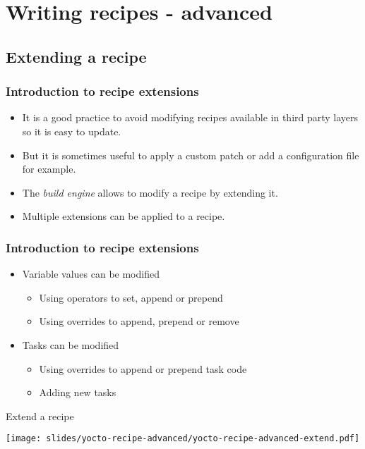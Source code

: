 \section{Writing recipes - advanced}

\subsection{Extending a recipe}

\begin{frame}
  \frametitle{Introduction to recipe extensions}
  \begin{itemize}
    \item It is a good practice to avoid modifying recipes available
          in third party layers so it is easy to update.
    \item But it is sometimes useful to apply a custom patch or add a
      configuration file for example.
    \item The  \emph{build engine} allows to modify a recipe by
          extending it.
    \item Multiple extensions can be applied to a recipe.
  \end{itemize}
\end{frame}

\begin{frame}
  \frametitle{Introduction to recipe extensions}
  \begin{itemize}
    \item Variable values can be modified
      \begin{itemize}
      \item Using operators to set, append or prepend
      \item Using overrides to append, prepend or remove
      \end{itemize}
    \item Tasks can be modified
      \begin{itemize}
      \item Using overrides to append or prepend task code
      \item Adding new tasks
      \end{itemize}
  \end{itemize}
\end{frame}

\begin{frame}{Extend a recipe}
  \begin{center}
    \texttt{[image: slides/yocto-recipe-advanced/yocto-recipe-advanced-extend.pdf]}
  \end{center}
\end{frame}

